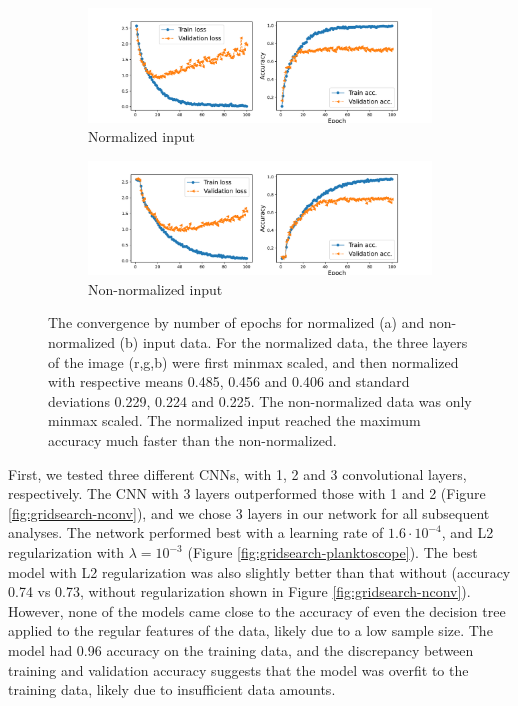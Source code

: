 \begin{figure}
    \centering
    \begin{subfigure}{1\linewidth}
        \includegraphics[width=\linewidth]{examples/tests_even/figs/CNN-test-epochs100-64.pdf}
        \caption{Normalized input}
        \label{fig:epochs1}
    \end{subfigure}
    \begin{subfigure}{1\linewidth}
        \includegraphics[width=\linewidth]{examples/tests_even/figs/CNN-test-epochs100-64notnorm.pdf}
        \caption{Non-normalized input}
        \label{fig:epochs2}
    \end{subfigure}
    \caption{The convergence by number of epochs for normalized (a) and non-normalized (b) input data. For the normalized data, the three layers of the image (r,g,b) were first minmax scaled, and then normalized with respective means 0.485, 0.456 and 0.406 and standard deviations 0.229, 0.224 and 0.225. The non-normalized data was only minmax scaled. The normalized input reached the maximum accuracy much faster than the non-normalized.}
    \label{fig:epochs}
\end{figure}

First, we tested three different CNNs, with 1, 2 and 3 convolutional layers, respectively. The CNN with 3 layers outperformed those with 1 and 2 (Figure \ref{fig:gridsearch-nconv}), and we chose 3 layers in our network for all subsequent analyses. The network performed best with a learning rate of $1.6 \cdot 10^{-4}$, and L2 regularization with $\lambda = 10^{-3}$ (Figure \ref{fig:gridsearch-planktoscope}). The best model with L2 regularization was also slightly better than that without (accuracy 0.74 vs 0.73, without regularization shown in Figure \ref{fig:gridsearch-nconv}). However, none of the models came close to the accuracy of even the decision tree applied to the regular features of the data, likely due to a low sample size. The model had 0.96 accuracy on the training data, and the discrepancy between training and validation accuracy suggests that the model was overfit to the training data, likely due to insufficient data amounts.

